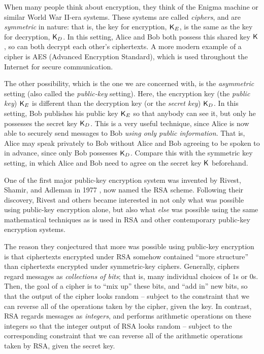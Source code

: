 When many people think about encryption, they think of the Enigma machine or similar World War II-era systems. These systems are called \emph{ciphers}, and are \emph{symmetric} in nature: that is, the key for encryption, ${\sf K}_E$, is the same as the key for decryption, ${\sf K}_D$. In this setting, Alice and Bob both possess this shared key ${\sf K}$, so can both decrypt each other's ciphertexts. A more modern example of a cipher is AES (Advanced Encryption Standard), which is used throughout the Internet for secure communication.


The other possibility, which is the one we are concerned with, is the \emph{asymmetric} setting (also called the \emph{public-key} setting). Here, the encryption key (the \emph{public key}) ${\sf K}_E$ is different than the decryption key (or the \emph{secret key}) ${\sf K}_D$. In this setting, Bob publishes his public key ${\sf K}_E$ so that anybody can see it, but only he possesses the secret key ${\sf K}_D$. This is a very useful technique, since Alice is now able to securely send messages to Bob \emph{using only public information}. That is, Alice may speak privately to Bob without Alice and Bob agreeing to be spoken to in advance, since only Bob possesses ${\sf K}_D$. Compare this with the symmetric key setting, in which Alice and Bob need to agree on the secret key ${\sf K}$ beforehand.

One of the first major public-key encryption system was invented by Rivest, Shamir, and Adleman in 1977 \cite{rivest1978method}, now named the RSA scheme. Following their discovery, Rivest and others became interested in not only what was possible using public-key encryption alone, but also what \emph{else} was possible using the same mathematical techniques as is used in RSA and other contemporary public-key encryption systems.

The reason they conjectured that more was possible using public-key encryption is that ciphertexts encrypted under RSA somehow contained ``more structure'' than ciphertexts encrypted under symmetric-key ciphers. Generally, ciphers regard messages as \emph{collections of bits}; that is, many individual choices of $1$s or $0$s. Then, the goal of a cipher is to ``mix up'' these bits, and ``add in'' new bits, so that the output of the cipher looks random -- subject to the constraint that we can reverse all of the operations taken by the cipher, given the key. In contrast, RSA regards messages as \emph{integers}, and performs arithmetic operations on these integers so that the integer output of RSA looks random -- subject to the corresponding constraint that we can reverse all of the arithmetic operations taken by RSA, given the secret key.

